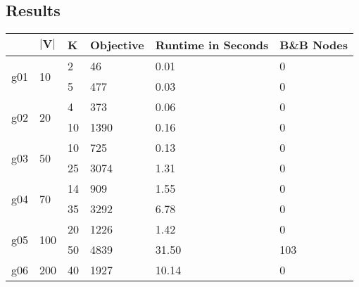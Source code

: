 \documentclass{article}
\begin{document}
\subsection{Results}
\begin{table}[h!]
	\centering
	\label{tab:mcf}
	\begin{tabular}{l|l|l|l|l|l}
		\textbf{}           & $\mathbf{|V|}$      	& \textbf{K} 	& \textbf{Objective} & \textbf{Runtime in Seconds} & \textbf{B\&B Nodes} \\ \hline
		\multirow{2}{*}{g01}& \multirow{2}{*}{10} 	& 2          	& 46                 & 0.01                        & 0                                        \\
							&                   	& 5       		& 477                & 0.03                        & 0                                        \\ \hline
		\multirow{2}{*}{g02}& \multirow{2}{*}{20} 	& 4          	& 373                & 0.06                        & 0                                        \\
							&                   	& 10        	& 1390               & 0.16                        & 0                                        \\ \hline
		\multirow{2}{*}{g03}& \multirow{2}{*}{50} 	& 10         	& 725                & 0.13                        & 0                                        \\
							&                   	& 25         	& 3074               & 1.31                        & 0                                        \\ \hline
		\multirow{2}{*}{g04}& \multirow{2}{*}{70} 	& 14         	& 909                & 1.55                        & 0                                        \\
							&                   	& 35         	& 3292               & 6.78                        & 0                                        \\ \hline
		\multirow{2}{*}{g05}& \multirow{2}{*}{100} 	& 20         	& 1226               & 1.42                        & 0                                        \\
							&                   	& 50         	& 4839               & 31.50                       & 103                                      \\ \hline
		\multirow{2}{*}{g06}& \multirow{2}{*}{200} 	& 40         	& 1927               & 10.14                       & 0                                        \\

\end{tabular}
\end{table}
\end{document}
